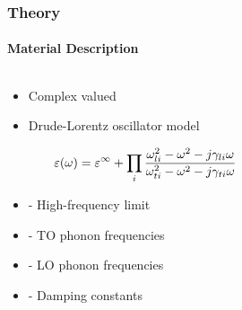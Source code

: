 \documentclass[mathserif,18pt,xcolor=table]{beamer}
\begin{document}
    \begin{frame}
      \frametitle{Theory}
      \framesubtitle{Material Description}
      \begin{columns}[T] %
        \begin{column}{.5\textwidth}
          \begin{itemize}
            \item Complex valued
            \item Drude-Lorentz oscillator model
          \end{itemize}
          \begin{equation} \nonumber
            \varepsilon(\omega) = \varepsilon^{\infty} + \prod_i\frac{\omega_{li}^2 - \omega^2 - j\gamma_{li} \omega}{\omega_{ti}^2 - \omega^2 - j\gamma_{ti} \omega}
            \label{eq:eps}
          \end{equation}
          \begin{itemize}
            \item[]{\makebox[.3cm][l]{$\E^{\inf}$} - High-frequency limit}
            \item[]{ - TO phonon frequencies}
            \item[]{ - LO phonon frequencies}
            \item[]{\makebox[.3cm][l]{$\gamma$} - Damping constants}
          \end{itemize}
        \end{column}
        \begin{column}[T]{.5\textwidth}
          \begin{figure}
            \vspace*{-2cm}
            \subfloat[]{
            \label{fig:eps_Ga}}
            \vspace*{0cm}
          \end{figure}
          \end{column}%
        \end{columns}
      \end{frame}
\end{document}
